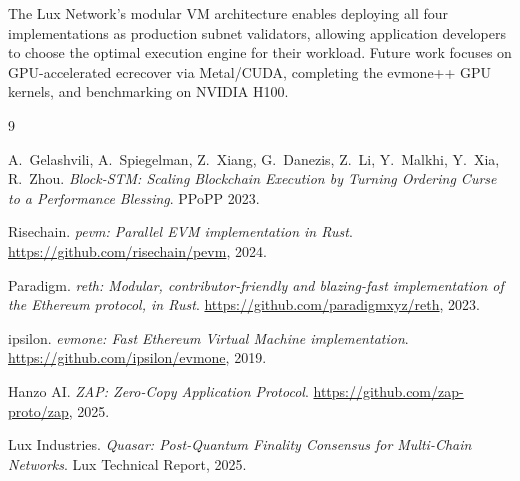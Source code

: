 \documentclass[11pt,twocolumn]{article}
\begin{document}
The Lux Network's modular VM architecture enables deploying all four implementations
as production subnet validators, allowing application developers to choose the optimal
execution engine for their workload. Future work focuses on GPU-accelerated ecrecover
via Metal/CUDA, completing the evmone++ GPU kernels, and benchmarking on NVIDIA H100.

\begin{thebibliography}{9}

A.~Gelashvili, A.~Spiegelman, Z.~Xiang, G.~Danezis, Z.~Li, Y.~Malkhi, Y.~Xia, R.~Zhou.
\emph{Block-STM: Scaling Blockchain Execution by Turning Ordering Curse to a Performance Blessing}.
PPoPP 2023.

Risechain.
\emph{pevm: Parallel EVM implementation in Rust}.
\url{https://github.com/risechain/pevm}, 2024.

Paradigm.
\emph{reth: Modular, contributor-friendly and blazing-fast implementation of the Ethereum protocol, in Rust}.
\url{https://github.com/paradigmxyz/reth}, 2023.

ipsilon.
\emph{evmone: Fast Ethereum Virtual Machine implementation}.
\url{https://github.com/ipsilon/evmone}, 2019.

Hanzo AI.
\emph{ZAP: Zero-Copy Application Protocol}.
\url{https://github.com/zap-proto/zap}, 2025.

Lux Industries.
\emph{Quasar: Post-Quantum Finality Consensus for Multi-Chain Networks}.
Lux Technical Report, 2025.

\end{thebibliography}
\end{document}
